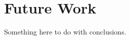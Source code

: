 
\section{Future Work}
\label{chpConclusions-secFutureWork}

Something here to do with conclusions.

